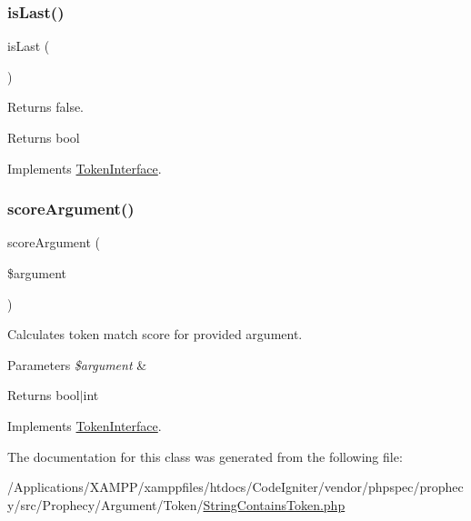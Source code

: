 \subsubsection{\texorpdfstring{is\+Last()}{isLast()}}
{\footnotesize\ttfamily is\+Last (\begin{DoxyParamCaption}{ }\end{DoxyParamCaption})}

Returns false.

\begin{DoxyReturn}{Returns}
bool 
\end{DoxyReturn}


Implements \mbox{\hyperlink{interface_prophecy_1_1_argument_1_1_token_1_1_token_interface_ac72b8349b1340887fc1af30eca2b951c}{Token\+Interface}}.

\mbox{\label{class_prophecy_1_1_argument_1_1_token_1_1_string_contains_token_a8d5bf47ab6eaa935458d5ad160e52822}} 
\subsubsection{\texorpdfstring{score\+Argument()}{scoreArgument()}}
{\footnotesize\ttfamily score\+Argument (\begin{DoxyParamCaption}\item[{}]{\$argument }\end{DoxyParamCaption})}

Calculates token match score for provided argument.


\begin{DoxyParams}{Parameters}
{\em \$argument} & \\
\hline
\end{DoxyParams}
\begin{DoxyReturn}{Returns}
bool$\vert$int 
\end{DoxyReturn}


Implements \mbox{\hyperlink{interface_prophecy_1_1_argument_1_1_token_1_1_token_interface_a8d5bf47ab6eaa935458d5ad160e52822}{Token\+Interface}}.



The documentation for this class was generated from the following file\+:\begin{DoxyCompactItemize}
\item 
/\+Applications/\+X\+A\+M\+P\+P/xamppfiles/htdocs/\+Code\+Igniter/vendor/phpspec/prophecy/src/\+Prophecy/\+Argument/\+Token/\mbox{\hyperlink{_string_contains_token_8php}{String\+Contains\+Token.\+php}}\end{DoxyCompactItemize}
